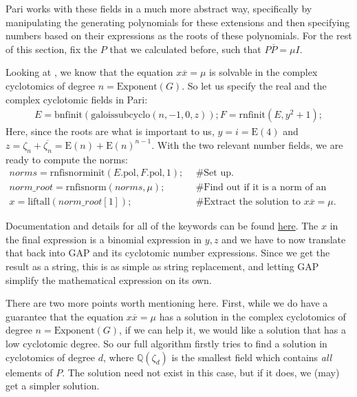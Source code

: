 \documentclass[11pt]{article}
\begin{document}
Pari works with these fields in a much more abstract way, specifically by manipulating
the generating polynomials for these extensions and then specifying numbers based on
their expressions as the roots of these polynomials. For the rest of this section,
fix the $P$ that we calculated before, such that $P\overline{P} = \mu I$.

Looking at \cite[Theorem 1.1]{Pas21}, we know that the equation $x\overline{x}=\mu$
is solvable in the complex cyclotomics of degree $n = \text{Exponent}(G)$. So let
us specify the real and the complex cyclotomic fields in Pari:
\begin{align*}
  E = \text{bnfinit}(\text{galoissubcyclo}(n,-1,0,z));
  F = \text{rnfinit}(E, y^2 + 1);
\end{align*}
Here, since the roots are what is important to us, $y = i = \text{E}(4)$ and
$z = \zeta_n + \overline{\zeta_n} = \text{E}(n) + \text{E}(n)^{n-1}$.
With the two relevant number fields, we are ready to compute the norms:
\begin{align*}
  norms = \text{rnfisnorminit}(E\text{.pol}, F\text{.pol}, 1); &~~\text{\# Set up.}\\
  norm\_root = \text{rnfisnorm}(norms, \mu); &~~\text{\# Find out if it is a norm of an element.}\\
  x = \text{liftall}(norm\_root[1]); &~~\text{\# Extract the solution to } x\overline{x} = \mu.
\end{align*}

Documentation and details for all of the keywords can be found
\href{https://pari.math.u-bordeaux.fr/dochtml/html/General_number_fields.html}{here}.
The $x$ in the final expression is a binomial expression in $y,z$ and we have to now
translate that back into GAP and its cyclotomic number expressions.
Since we get the result as a string, this is as simple as string replacement,
and letting GAP simplify the mathematical expression on its own.

There are two more points worth mentioning here. First, while we do have a guarantee
that the equation $x\overline{x}=\mu$ has a solution in the complex cyclotomics of
degree $n = \text{Exponent}(G)$, if we can help it, we would like a solution that
has a low cyclotomic degree. So our full algorithm firstly tries to find a solution
in cyclotomics of degree $d$, where $\mathbb{Q}(\zeta_d)$ is the smallest field
which contains \textit{all} elements of $P$. The solution need not exist in this
case, but if it does, we (may) get a simpler solution.
\end{document}
